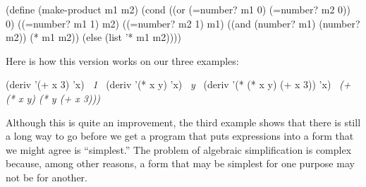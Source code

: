 \begin{codeBlock}
(define (make-product m1 m2)
  (cond ((or (=number? m1 0) (=number? m2 0)) 0)
        ((=number? m1 1) m2)
        ((=number? m2 1) m1)
        ((and (number? m1) (number? m2)) (* m1 m2))
        (else (list '* m1 m2))))
\end{codeBlock}

\noindent
Here is how this version works on our three examples:

\begin{codeBlock}
(deriv '(+ x 3) 'x)
~\textit{1}~
(deriv '(* x y) 'x)
~\textit{y}~
(deriv '(* (* x y) (+ x 3)) 'x)
~\textit{(+ (* x y) (* y (+ x 3)))}~
\end{codeBlock}

\noindent
Although this is quite an improvement, the third example shows that there is
still a long way to go before we get a program that puts expressions into a
form that we might agree is ``simplest.''  The problem of algebraic
simplification is complex because, among other reasons, a form that may be
simplest for one purpose may not be for another.

